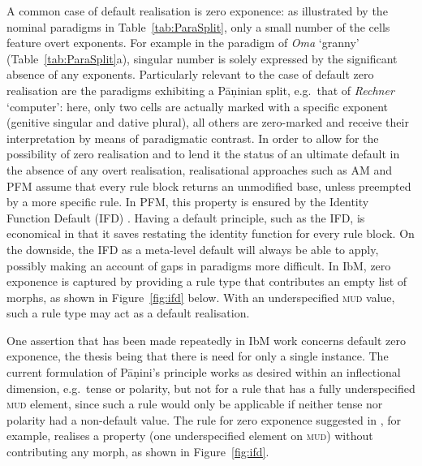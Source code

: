 \documentclass[output=paper
 	        ,biblatex
                ,babelshorthands
                ,newtxmath
                ,draftmode
                ,colorlinks, citecolor=brown
]{langscibook}
\begin{document}
\begin{exe}
\begin{xlist}
\begin{exe}
\begin{xlist}
\begin{exe}
\end{exe}

A common case of default realisation is zero exponence: as illustrated
by the  nominal paradigms in Table~\ref{tab:ParaSplit}, only a
small number of the cells feature overt exponents. For example in the paradigm
of \textit{Oma} `granny' (Table~\ref{tab:ParaSplit}a), singular number
is solely expressed by the significant absence of any
exponents. Particularly relevant to the case of default zero
realisation are the paradigms exhibiting a Pāṇinian split, e.g.\ that
of \textit{Rechner} `computer': here, only two cells are actually
marked with a specific exponent (genitive singular and dative plural),
all others are zero-marked and receive their interpretation by means
of paradigmatic contrast. In order to allow for the possibility of
zero realisation and to lend it the status of an ultimate default in
the absence of any overt realisation, realisational approaches such as
AM and PFM assume that every rule block returns an unmodified base,
unless preempted by a more specific rule. In PFM, this property is
ensured by the Identity Function Default (IFD)
\citep[][53]{Stump01}. Having a default principle, such as the IFD, is
economical in that it saves restating the identity function for every
rule block. On the downside, the IFD as a meta-level default 
will always be able to apply, possibly making an account of gaps in
paradigms more difficult. In IbM, zero exponence is captured by
providing a rule type that contributes an empty list of morphs, as
shown in Figure~\ref{fig:ifd} below. With an underspecified \textsc{mud}
value, such a rule type may act as a default realisation.

One assertion that has been made repeatedly in IbM work concerns
default zero exponence, the thesis being that there is need for only a
single instance. The current formulation of Pāṇini's principle works
as desired within an inflectional dimension, e.g.\ tense or polarity,
but not for a rule that has a fully underspecified \textsc{mud}
element, since such a rule would only be applicable if neither tense
nor polarity had a non-default value.  The rule for zero exponence
suggested in \citet{Crysmann:Bonami:2016}, for example, realises a
property (one underspecified element on \textsc{mud}) without
contributing any morph, as shown in Figure~\ref{fig:ifd}.



\begin{figure} 


\end{figure}
\end{xlist}
\end{exe}
\end{xlist}
\end{exe}
\end{document}
